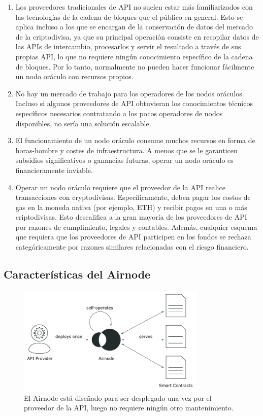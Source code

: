 \documentclass[11pt]{article}
\begin{document}
\begin{enumerate}
    \item Los proveedores tradicionales de API no suelen estar más familiarizados con las tecnologías de la cadena de bloques que el público en general. Esto se aplica incluso a los que se encargan de la conservación de datos del mercado de la criptodivisa, ya que su principal operación consiste en recopilar datos de las APIs de intercambio, procesarlos y servir el resultado a través de sus propias API, lo que no requiere ningún conocimiento específico de la cadena de bloques. Por lo tanto, normalmente no pueden hacer funcionar fácilmente un nodo oráculo con recursos propios.
    \item No hay un mercado de trabajo para los operadores de los nodos oráculos. Incluso si algunos proveedores de API obtuvieran los conocimientos técnicos específicos necesarios contratando a los pocos operadores de nodos disponibles, no sería una solución escalable.
    \item El funcionamiento de un nodo oráculo consume muchos recursos en forma de horas-hombre y costes de infraestructura. A menos que se le garanticen subsidios significativos o ganancias futuras, operar un nodo oráculo es financieramente inviable.
    \item Operar un nodo oráculo requiere que el proveedor de la API realice transacciones con cryptodivisas. Específicamente, deben pagar los costos de gas en la moneda nativa (por ejemplo, ETH) y recibir pagos en una o más criptodivisas. Esto descalifica a la gran mayoría de los proveedores de API por razones de cumplimiento, legales y contables. Además, cualquier esquema que requiera que los proveedores de API participen en los fondos se rechaza categóricamente por razones similares relacionadas con el riesgo financiero.
\end{enumerate}

\subsection{Características del Airnode}
\label{sec:airnode-features}

\begin{figure}
    \centering
	\includegraphics[width=0.8\textwidth]{fig/airnode.pdf}
	\caption{El Airnode está diseñado para ser desplegado una vez por el proveedor de la API, luego no requiere ningún otro mantenimiento.}
	\label{fig:airnode}
\end{figure}
\end{document}
